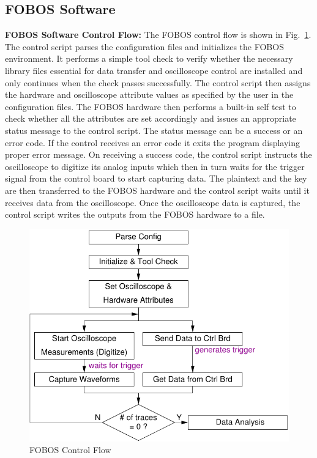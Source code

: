 \documentclass{llncs}
\numberwithin{algorithm}{chapter}
\begin{document}
\subsection{FOBOS Software}
%
\textbf{FOBOS Software Control Flow:}
The FOBOS control flow is shown in Fig.~\ref{fig:fobos-ctrlflow}. The control script
parses the configuration files and initializes the FOBOS
environment. It performs a simple tool check to verify whether the necessary
library files essential for data transfer and oscilloscope control are 
installed and only continues when the check passes successfully. The control script 
then assigns the hardware and oscilloscope attribute values as specified by the user 
in the configuration files. The FOBOS hardware then performs a built-in self test to
check whether all the attributes are set accordingly and issues an appropriate 
status message to the control script. The status message can be a success or an error 
code. If the control receives an error code it exits the program displaying proper error message.
On receiving a success code, the control script instructs the oscilloscope to digitize
its analog inputs which then in turn waits for the trigger 
signal from the control board to start capturing data.
The plaintext and the key are then transferred to the FOBOS hardware and the control
script waits until it receives data from the oscilloscope. Once the oscilloscope data 
is captured, the control script writes the outputs from the FOBOS hardware to a file.
\begin{figure}[ht]
\begin{center}
\includegraphics[scale=0.8]{figures/data_acq}
\caption{\label{fig:fobos-ctrlflow}FOBOS Control Flow}
\end{center} 
\vspace{-3ex}
\end{figure}
\end{document}
